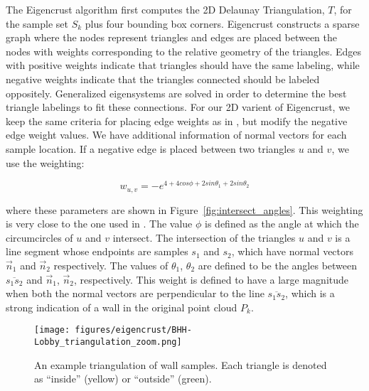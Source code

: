 \documentclass[10pt,twocolumn,letterpaper]{article}
\begin{document}
The Eigencrust algorithm first computes the 2D Delaunay Triangulation, $T$, for the sample set $S_k$ plus four bounding box corners.  Eigencrust constructs a sparse graph where the nodes represent triangles and edges are placed between the nodes with weights corresponding to the relative geometry of the triangles.  Edges with positive weights indicate that triangles should have the same labeling, while negative weights indicate that the triangles connected should be labeled oppositely.  Generalized eigensystems are solved in order to determine the best triangle labelings to fit these connections.  For our 2D varient of Eigencrust, we keep the same criteria for placing edge weights as in \cite{Eigencrust}, but modify the negative edge weight values.  We have additional information of normal vectors for each sample location. If a negative edge is placed between two triangles $u$ and $v$, we use the weighting:

\begin{equation}
w_{u,v} = - e ^ {4 + 4 cos \phi + 2 sin \theta_1 + 2 sin \theta_2}
\label{neg_edge_weight}
\end{equation}

where these parameters are shown in Figure~\ref{fig:intersect_angles}.  This weighting is very close to the one used in \cite{Eigencrust}.  The value $\phi$ is defined as the angle at which the circumcircles of $u$ and $v$ intersect.  The intersection of the triangles $u$ and $v$ is a line segment whose endpoints are samples $s_1$ and $s_2$, which have normal vectors $\vec{n}_1$ and $\vec{n}_2$ respectively.  The values of $\theta_1$, $\theta_2$ are defined to be the angles between $\overline{s_1 s_2}$ and $\vec{n}_1$, $\vec{n}_2$, respectively.  This weight is defined to have a large magnitude when both the normal vectors are perpendicular to the line $\overline{s_1 s_2}$, which is a strong indication of a wall in the original point cloud $P_k$.

\begin{figure}[t]

\begin{minipage}[b]{1.0\linewidth}
  \centering
  \centerline{\texttt{[image: figures/eigencrust/BHH-Lobby\_triangulation\_zoom.png]}}
\end{minipage}

\caption{An example triangulation of wall samples.  Each triangle is denoted as ``inside'' (yellow) or ``outside'' (green).}
\label{fig:triangulation}

\end{figure}
\end{document}
